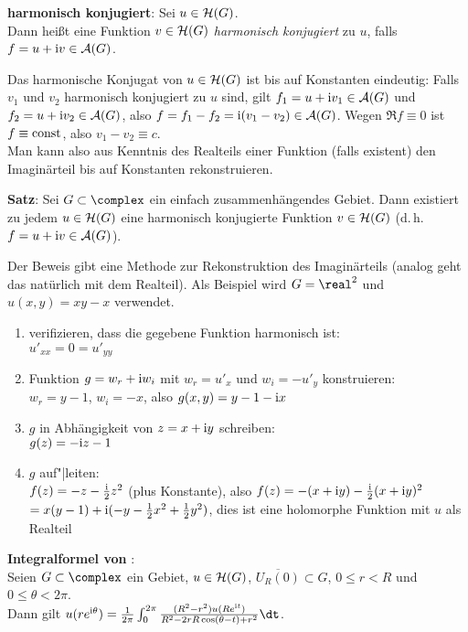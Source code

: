 \linie

\textbf{harmonisch konjugiert}:
Sei $u \in \mathcal{H}(G)$.\\
Dann heißt eine Funktion $v \in \mathcal{H}(G)$ \emph{harmonisch konjugiert} zu $u$,
falls $f = u + \mathrm{i} v \in \mathcal{A}(G)$.

Das harmonische Konjugat von $u \in \mathcal{H}(G)$ ist bis auf Konstanten eindeutig:
Falls $v_1$ und $v_2$ harmonisch konjugiert zu $u$ sind, gilt
$f_1 = u + \mathrm{i} v_1 \in \mathcal{A}(G)$ und $f_2 = u + \mathrm{i} v_2 \in \mathcal{A}(G)$, also
$f = f_1 - f_2 = \mathrm{i} (v_1 - v_2) \in \mathcal{A}(G)$.
Wegen $\Re f \equiv 0$ ist $f \equiv \operatorname{const}$, also $v_1 - v_2 \equiv c$.\\
Man kann also aus Kenntnis des Realteils einer Funktion (falls existent) den
Imaginärteil bis auf Konstanten rekonstruieren.

\textbf{Satz}:
Sei $G \subset \complex$ ein einfach zusammenhängendes Gebiet.
Dann existiert zu jedem $u \in \mathcal{H}(G)$ eine harmonisch konjugierte Funktion
$v \in \mathcal{H}(G)$ (d.\,h. $f = u + \mathrm{i} v \in \mathcal{A}(G)$).

Der Beweis gibt eine Methode zur Rekonstruktion des Imaginärteils
(analog geht das natürlich mit dem Realteil).
Als Beispiel wird $G = \real^2$ und $u(x, y) = xy - x$ verwendet.

\begin{enumerate}
    \item
    verifizieren, dass die gegebene Funktion harmonisch ist:\\
    $u'_{xx} = 0 = u'_{yy}$

    \item
    Funktion $g = w_r + \mathrm{i} w_i$ mit $w_r = u'_x$ und $w_i = -u'_y$
    konstruieren:\\
    $w_r = y - 1$, $w_i = -x$, also
    $g(x, y) = y - 1 - \mathrm{i} x$

    \item
    $g$ in Abhängigkeit von $z = x + \mathrm{i} y$ schreiben:\\
    $g(z) = -\mathrm{i} z - 1$

    \item
    $g$ auf"|leiten:\\
    $f(z) = -z - \frac{\mathrm{i}}{2} z^2$ (plus Konstante), also
    $f(z) = -(x + \mathrm{i} y) - \frac{\mathrm{i}}{2} (x + \mathrm{i} y)^2$\\
    $= x(y - 1) + \mathrm{i} (-y - \frac{1}{2} x^2 + \frac{1}{2} y^2)$,
    dies ist eine holomorphe Funktion mit $u$ als Realteil
\end{enumerate}

\linie

\textbf{Integralformel von }:\\
Seien $G \subset \complex$ ein Gebiet, $u \in \mathcal{H}(G)$,
$\overline{U_R(0)} \subset G$, $0 \le r < R$ und $0 \le \theta < 2\pi$.\\
Dann gilt $u(r e^{\i\theta}) = \frac{1}{2\pi}
\int_0^{2\pi} \frac{(R^2 - r^2) u(R e^{\i t})}
{R^2 - 2rR \cos(\theta - t) + r^2} \dt$.

